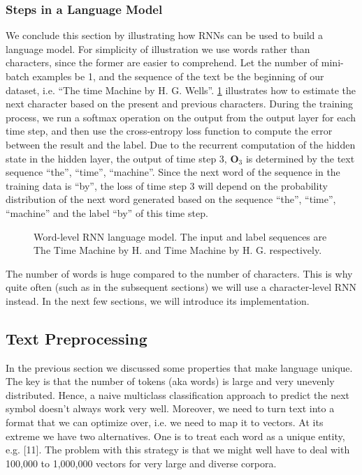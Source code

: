 \subsubsection{Steps in a Language Model}

We conclude this section by illustrating how RNNs can be used to build a language model. For simplicity of illustration we use words rather than characters, since the former are easier to comprehend. Let the number of mini-batch examples be 1, and the sequence of the text be the beginning of our dataset, i.e. “The time Machine by H. G. Wells”. \cref{fig:rnn-train} illustrates how to estimate the next character based on the present and previous characters. During the training process, we run a softmax operation on the output from the output layer for each time step, and then use the cross-entropy loss function to compute the error between the result and the label. Due to the recurrent computation of the hidden state in the hidden layer, the output of time step 3, $\mathbf{O}_3$ is determined by the text sequence “the”, “time”, “machine”. Since the next word of the sequence in the training data is “by”, the loss of time step 3 will depend on the probability distribution of the next word generated based on the sequence “the”, “time”, “machine” and the label “by” of this time step.

\begin{figure}[hpt]
	\centering
	
	\caption{Word-level RNN language model. The input and label sequences are The Time Machine by H. and Time Machine by H. G. respectively.}
	\label{fig:rnn-train}
\end{figure}


The number of words is huge compared to the number of characters. This is why quite often (such as in the subsequent sections) we will use a character-level RNN instead. In the next few sections, we will introduce its implementation.

\subsection{Text Preprocessing}

In the previous section we discussed some properties that make language unique. The key is that the number of tokens (aka words) is large and very unevenly distributed. Hence, a naive multiclass classification approach to predict the next symbol doesn’t always work very well. Moreover, we need to turn text into a format that we can optimize over, i.e. we need to map it to vectors. At its extreme we have two alternatives. One is to treat each word as a unique entity, e.g. [11]. The problem with this strategy is that we might well have to deal with 100,000 to 1,000,000 vectors for very large and diverse corpora.

